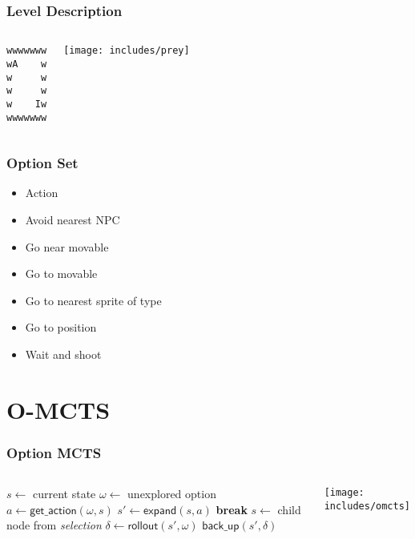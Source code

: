 \documentclass[aspectratio=169]{beamer}
\begin{document}
\begin{frame}[fragile]
	\frametitle{Level Description}
	\begin{columns}[c]
		\centering
		\begin{lstlisting}[caption=Level, frame=tb, xleftmargin=.3\textwidth, xrightmargin=.3\textwidth]
wwwwwww
wA    w
w     w
w     w
w    Iw
wwwwwww
		\end{lstlisting}
		\texttt{[image: includes/prey]}
	\end{columns}
\end{frame}

\begin{frame}
	\frametitle{Option Set}
	\begin{itemize}
		\item Action
		\item Avoid nearest NPC
		\item Go near movable
		\item Go to movable
		\item Go to nearest sprite of type
		\item Go to position
		\item Wait and shoot
	\end{itemize}
\end{frame}

\section{O-MCTS}
\begin{frame}
	\frametitle{Option MCTS}
	\begin{columns}
		\small
		\vspace{-.5em}
		\begin{algorithmic}[1]
				\State $s \gets $ current state
						\State $\omega \gets$ unexplored option
						\State $a \gets \mathsf{get\_action}(\omega, s)$ 
						\State $s' \gets \mathsf{expand}(s, a)$ 
						\State \textbf{break} \label{alg:omcts:break}
					\Else \label{alg:omcts:sexpand}
						\State $s \gets$ child node from \emph{selection}
					\EndIf \label{alg:omcts:eexpand}
				\EndWhile
				\State $\delta \gets \mathsf{rollout}(s', \omega)$
				\State $\mathsf{back\_up}(s', \delta)$
			\EndWhile
			\State {}
		\end{algorithmic}

		\texttt{[image: includes/omcts]}
	\end{columns}
\end{frame}
\end{document}
